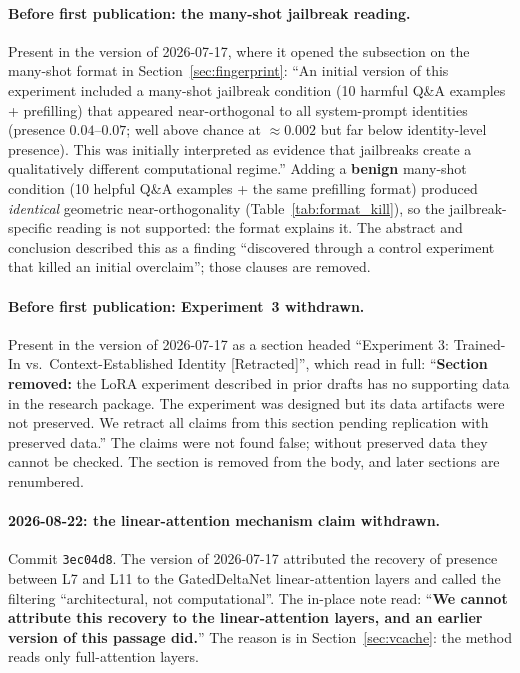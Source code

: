 \documentclass[11pt,a4paper]{article}
\begin{document}
\paragraph{Before first publication: the many-shot jailbreak reading.}
Present in the version of 2026-07-17, where it opened the subsection on the
many-shot format in Section~\ref{sec:fingerprint}:
``An initial version of this experiment included a many-shot jailbreak
condition (10 harmful Q\&A examples + prefilling) that appeared
near-orthogonal to all system-prompt identities (presence
$0.04$--$0.07$; well above chance at ${\approx}0.002$ but far below
identity-level presence). This was initially interpreted as evidence that
jailbreaks create a qualitatively different computational regime.'' Adding a
\textbf{benign} many-shot condition (10 helpful Q\&A examples + the same
prefilling format) produced \emph{identical} geometric near-orthogonality
(Table~\ref{tab:format_kill}), so the jailbreak-specific reading is not
supported: the format explains it. The abstract and conclusion described
this as a finding ``discovered through a control experiment that killed an
initial overclaim''; those clauses are removed.

\paragraph{Before first publication: Experiment~3 withdrawn.}
Present in the version of 2026-07-17 as a section headed ``Experiment 3:
Trained-In vs.\ Context-Established Identity [Retracted]'', which read in
full: ``\textbf{Section removed:} the LoRA experiment described in prior
drafts has no supporting data in the research package. The experiment was
designed but its data artifacts were not preserved. We retract all claims
from this section pending replication with preserved data.'' The claims
were not found false; without preserved data they cannot be checked. The
section is removed from the body, and later sections are renumbered.

\paragraph{2026-08-22: the linear-attention mechanism claim withdrawn.}
Commit \texttt{3ec04d8}. The version of 2026-07-17 attributed the recovery
of presence between L7 and L11 to the GatedDeltaNet linear-attention
layers and called the filtering ``architectural, not computational''. The
in-place note read: ``\textbf{We cannot attribute this recovery to the
linear-attention layers, and an earlier version of this passage did.}''
The reason is in Section~\ref{sec:vcache}: the method reads only
full-attention layers.
\end{document}
